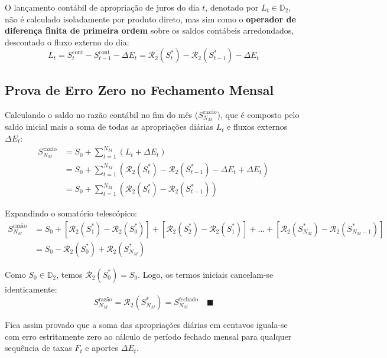 \documentclass[11pt, a4paper]{article}
\begin{document}
O lançamento contábil de apropriação de juros do dia $t$, denotado por $L_t \in \mathbb{D}_2$, não é calculado isoladamente por produto direto, mas sim como o \textbf{operador de diferença finita de primeira ordem} sobre os saldos contábeis arredondados, descontado o fluxo externo do dia:
\begin{equation}
    L_t = S_t^{\text{cont}} - S_{t-1}^{\text{cont}} - \Delta E_t = \mathcal{R}_2(S_t^{*}) - \mathcal{R}_2(S_{t-1}^{*}) - \Delta E_t
\end{equation}

\subsection{Prova de Erro Zero no Fechamento Mensal}

Calculando o saldo no razão contábil no fim do mês ($S_{N_M}^{\text{razão}}$), que é composto pelo saldo inicial mais a soma de todas as apropriações diárias $L_t$ e fluxos externos $\Delta E_t$:
\begin{align}
    S_{N_M}^{\text{razão}} &= S_0 + \sum_{t=1}^{N_M} \left( L_t + \Delta E_t \right) \\
    &= S_0 + \sum_{t=1}^{N_M} \left( \mathcal{R}_2(S_t^{*}) - \mathcal{R}_2(S_{t-1}^{*}) - \Delta E_t + \Delta E_t \right) \\
    &= S_0 + \sum_{t=1}^{N_M} \left( \mathcal{R}_2(S_t^{*}) - \mathcal{R}_2(S_{t-1}^{*}) \right)
\end{align}

Expandindo o somatório telescópico:
\begin{align}
    S_{N_M}^{\text{razão}} &= S_0 + \left[ \mathcal{R}_2(S_1^{*}) - \mathcal{R}_2(S_0^{*}) \right] + \left[ \mathcal{R}_2(S_2^{*}) - \mathcal{R}_2(S_1^{*}) \right] + \dots + \left[ \mathcal{R}_2(S_{N_M}^{*}) - \mathcal{R}_2(S_{N_M-1}^{*}) \right] \nonumber \\
    &= S_0 - \mathcal{R}_2(S_0^{*}) + \mathcal{R}_2(S_{N_M}^{*})
\end{align}

Como $S_0 \in \mathbb{D}_2$, temos $\mathcal{R}_2(S_0^{*}) = S_0$. Logo, os termos iniciais cancelam-se identicamente:
\begin{equation}
    S_{N_M}^{\text{razão}} = \mathcal{R}_2(S_{N_M}^{*}) = S_{N_M}^{\text{fechado}} \quad \blacksquare
\end{equation}

Fica assim provado que a soma das apropriações diárias em centavos iguala-se com erro estritamente zero ao cálculo de período fechado mensal para qualquer sequência de taxas $F_t$ e aportes $\Delta E_t$.
\end{document}

